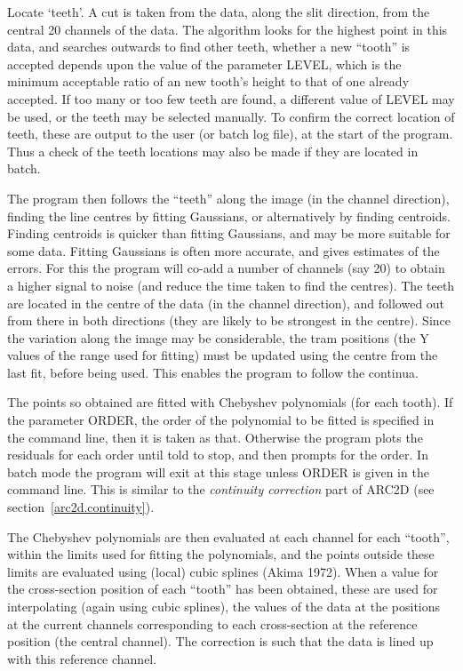 \begin{list}{()}{}
\item
Locate `teeth'. A cut is taken from the data, along the slit direction,
from the central 20 channels of the data.
The algorithm looks for
the highest point in this data, and searches outwards to find other
teeth, whether a new ``tooth'' is accepted depends upon the value of the
parameter LEVEL, which is the minimum acceptable ratio of an new
tooth's height to that of one already accepted. If too many or too few teeth are found, a
different value of LEVEL may be used, or the teeth may be selected
manually. To confirm the correct location of teeth, these are output to
the user (or batch log file), at the start of the program. Thus a check
of the teeth locations may also be made if they are located in batch.
\item
The program then follows the ``teeth'' along the image (in the
channel direction), finding the line centres by fitting Gaussians, or
alternatively by finding centroids. Finding centroids is quicker than
fitting Gaussians, and may be more suitable for some data. Fitting
Gaussians is often more accurate, and gives estimates of the errors.
For this the program will co-add a number of channels (say 20) to
obtain a higher signal to noise (and reduce the time taken to find the
centres).
The teeth are located in the centre of the data (in the channel
direction), and followed out from there in both directions (they are
likely to be strongest in the centre).
Since the variation along the image may be considerable, the tram
positions (the Y values of the range used for fitting) must be updated
using the centre from the last fit, before being used.
This enables the program to follow the continua.
\item
The points so obtained are fitted with Chebyshev polynomials
(for each tooth). If the parameter ORDER, the order of the polynomial to be fitted is
specified in the command line, then it is taken as that. Otherwise the
program plots the residuals for each order until told to stop, and then
prompts for the order.
In batch mode the program will exit at this stage unless ORDER is given
in the command line.
This is similar to the {\em continuity correction} part of ARC2D (see
section~\ref{arc2d.continuity}).
\item
The Chebyshev polynomials are then evaluated at each channel for
each ``tooth'', within the limits used for fitting the polynomials, and
the points outside these limits are evaluated using (local) cubic
splines (Akima 1972). When a value for the cross-section position of
each ``tooth'' has been obtained, these are used for interpolating
(again using cubic splines), the values of the data at the positions at
the current channels corresponding to each cross-section at the
reference position (the central channel). The correction is such that
the data is lined up with this reference channel.
\end{list}

